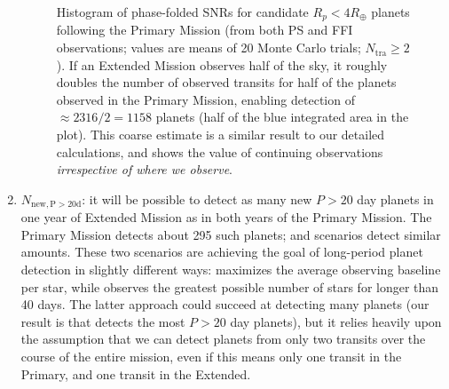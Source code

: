 \begin{enumerate}
\begin{figure}[!t]
	\caption{Histogram of phase-folded SNRs for candidate $R_p<4R_\oplus$ planets following the Primary Mission (from both PS and FFI observations; values are means of 20 Monte Carlo trials; $N_\mathrm{tra}\geq2$).
	If an Extended Mission observes half of the sky, it roughly doubles the number of observed transits for half of the planets observed in the Primary Mission, enabling detection of $\approx 2316/2 = 1158$ planets (half of the blue integrated area in the plot). This coarse estimate is a similar result to our detailed calculations, and shows the value of continuing \tesss observations \textit{irrespective of where we observe}.}
	\label{fig:snrf_histogram}
\end{figure}

	\item $N_\mathrm{new,P>20d}$: it will be possible to detect as many new $P>20$ day planets in one year of \tesss Extended Mission as in both years of the Primary Mission.
	The Primary Mission detects about 295 such planets; \hemis\:and \npole\:scenarios detect similar amounts.
	These two scenarios are achieving the goal of long-period planet detection in slightly different ways: %
	\npole\:maximizes the average observing baseline per star, while \hemis\:observes the greatest possible number of stars for longer than 40 days.
	The latter approach could succeed at detecting many planets (our result is that \hemis\:detects the most $P>20$ day planets), but it relies heavily upon the assumption that we can detect planets from only two transits over the course of the entire mission, even if this means only one transit in the Primary, and one transit in the Extended.


\end{enumerate}
